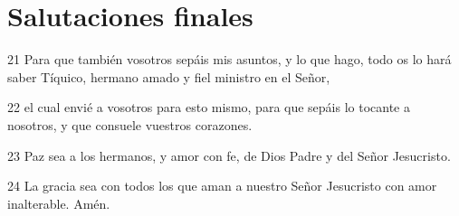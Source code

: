 \section*{Salutaciones finales}

\par 21 Para que también vosotros sepáis mis asuntos, y lo que hago, todo os lo hará saber Tíquico, hermano amado y fiel ministro en el Señor,
\par 22 el cual envié a vosotros para esto mismo, para que sepáis lo tocante a nosotros, y que consuele vuestros corazones.
\par 23 Paz sea a los hermanos, y amor con fe, de Dios Padre y del Señor Jesucristo.
\par 24 La gracia sea con todos los que aman a nuestro Señor Jesucristo con amor inalterable. Amén.

